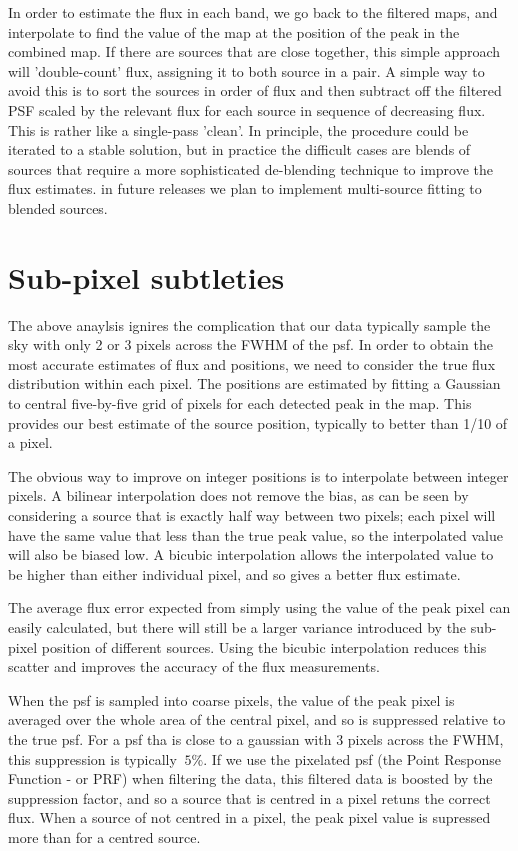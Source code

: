 \documentclass[useAMS,usenatbib]{mn2e}
\begin{document}
In order to estimate the flux in each band, we go back to the filtered
maps, and interpolate to find the value of the map at the position of
the peak in the combined map. If there are sources that are close
together, this simple approach will 'double-count' flux, assigning it
to both source in a pair. A simple way to avoid this is to sort the
sources in order of flux and then subtract off the filtered PSF scaled
by the relevant flux for each source in sequence of decreasing flux.
This is rather like a single-pass 'clean'. In principle, the procedure
could be iterated to a stable solution, but in practice the difficult
cases are blends of sources that require a more sophisticated
de-blending technique to improve the flux estimates. in future
releases we plan to implement multi-source fitting to blended sources.

\section{Sub-pixel subtleties} 



The above anaylsis ignires the complication that our data typically
sample the sky with only 2 or 3 pixels across the FWHM of the psf. In
order to obtain the most accurate estimates of flux and positions, we
need to consider the true flux distribution within each pixel. The
positions are estimated by fitting a Gaussian to central five-by-five
grid of pixels for each detected peak in the map. This provides our
best estimate of the source position, typically to better than 1/10 of
a pixel.

The obvious way to improve on integer positions is to
interpolate between integer pixels. A bilinear interpolation does not
remove the bias, as can be seen by considering a source that is
exactly half way between two pixels; each pixel will have the same
value that less than the true peak value, so the interpolated value
will also be biased low.  A bicubic interpolation allows the
interpolated value to be higher than either individual pixel, and so
gives a better flux estimate. 

The average flux error expected from simply using the value of the
peak pixel can easily calculated, but there will still be a
larger variance introduced by the sub-pixel position of different
sources. Using the bicubic interpolation reduces this scatter and
improves the accuracy of the flux measurements. 

When the psf is sampled into coarse pixels, the value of the peak pixel
is averaged over the whole area of the central pixel, and so is
suppressed relative to the true psf. For a psf tha is close to a
gaussian with 3 pixels across the FWHM, this suppression is typically
$~5\%$. If we use the pixelated psf (the Point Response Function - or
PRF) when filtering the data, this filtered data is boosted by the
suppression factor, and so a source that is centred in a pixel retuns
the correct flux. When a source of not centred in a pixel, the peak
pixel value is supressed more than for a centred source. 
\end{document}

